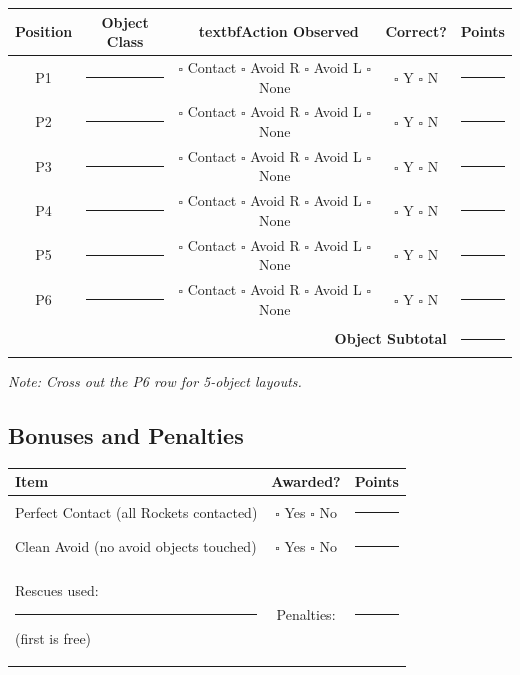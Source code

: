 \documentclass[a4]{article}
\begin{document}
\begin{table}[H]
\centering
\begin{tabular}{|c|c|c|c|c|}
\hline
\textbf{Position} & \textbf{Object Class} & \   textbf{Action Observed} & \textbf{Correct?} & \textbf{Points} \\
\hline
P1 & \rule{2cm}{0.4pt} & $\square$ Contact \quad $\square$ Avoid R \quad $\square$ Avoid L \quad $\square$ None & $\square$ Y $\square$ N & \rule{1.5cm}{0.4pt} \\
\hline
P2 & \rule{2cm}{0.4pt} & $\square$ Contact \quad $\square$ Avoid R \quad $\square$ Avoid L \quad $\square$ None & $\square$ Y $\square$ N & \rule{1.5cm}{0.4pt} \\
\hline
P3 & \rule{2cm}{0.4pt} & $\square$ Contact \quad $\square$ Avoid R \quad $\square$ Avoid L \quad $\square$ None & $\square$ Y $\square$ N & \rule{1.5cm}{0.4pt} \\
\hline
P4 & \rule{2cm}{0.4pt} & $\square$ Contact \quad $\square$ Avoid R \quad $\square$ Avoid L \quad $\square$ None & $\square$ Y $\square$ N & \rule{1.5cm}{0.4pt} \\
\hline
P5 & \rule{2cm}{0.4pt} & $\square$ Contact \quad $\square$ Avoid R \quad $\square$ Avoid L \quad $\square$ None & $\square$ Y $\square$ N & \rule{1.5cm}{0.4pt} \\
\hline
P6 & \rule{2cm}{0.4pt} & $\square$ Contact \quad $\square$ Avoid R \quad $\square$ Avoid L \quad $\square$ None & $\square$ Y $\square$ N & \rule{1.5cm}{0.4pt} \\
\hline
\multicolumn{4}{|r|}{\textbf{Object Subtotal}} & \rule{1.5cm}{0.4pt} \\
\hline
\end{tabular}
\end{table}

\textit{Note: Cross out the P6 row for 5-object layouts.}

\subsection*{Bonuses and Penalties}

\begin{table}[H]
\centering
\begin{tabular}{|l|c|c|}
\hline
\textbf{Item} & \textbf{Awarded?} & \textbf{Points} \\
\hline
Perfect Contact (all Rockets contacted) & $\square$ Yes \quad $\square$ No & \rule{1.5cm}{0.4pt} \\
\hline
Clean Avoid (no avoid objects touched) & $\square$ Yes \quad $\square$ No & \rule{1.5cm}{0.4pt} \\
\hline
Rescues used: \rule{1cm}{0.4pt} (first is free) & Penalties: & \rule{1.5cm}{0.4pt} \\
\hline
\end{tabular}
\end{table}
\end{document}
